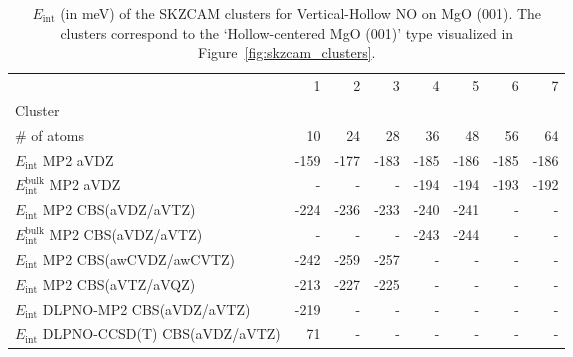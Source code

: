 \begin{table}
\caption{\label{tab:system_eint_mgo_no_vertical-hollow}$E_\textrm{int}$ (in meV) of the SKZCAM clusters for Vertical-Hollow NO on MgO (001). The clusters correspond to the `Hollow-centered MgO (001)' type visualized in Figure~\ref{fig:skzcam_clusters}.}
\begin{adjustbox}{center,max width=1.4\textwidth}
\begin{tabular}{lrrrrrrr}
\toprule
 & 1 & 2 & 3 & 4 & 5 & 6 & 7 \\ 
Cluster &  &  &  &  &  &  &  \\
\midrule
\# of atoms & 10 & 24 & 28 & 36 & 48 & 56 & 64 \\
$E_\textrm{int}$ MP2 aVDZ & -159 & -177 & -183 & -185 & -186 & -185 & -186 \\
$E_\textrm{int}^\textrm{bulk}$ MP2 aVDZ & - & - & - & -194 & -194 & -193 & -192 \\
$E_\textrm{int}$ MP2 CBS(aVDZ/aVTZ) & -224 & -236 & -233 & -240 & -241 & - & - \\
$E_\textrm{int}^\textrm{bulk}$ MP2 CBS(aVDZ/aVTZ) & - & - & - & -243 & -244 & - & - \\
$E_\textrm{int}$ MP2 CBS(awCVDZ/awCVTZ) & -242 & -259 & -257 & - & - & - & - \\
$E_\textrm{int}$ MP2 CBS(aVTZ/aVQZ) & -213 & -227 & -225 & - & - & - & - \\
$E_\textrm{int}$ DLPNO-MP2 CBS(aVDZ/aVTZ) & -219 & - & - & - & - & - & - \\
$E_\textrm{int}$ DLPNO-CCSD(T) CBS(aVDZ/aVTZ) & 71 & - & - & - & - & - & - \\
\bottomrule
\end{tabular}
\end{adjustbox}
\end{table}

